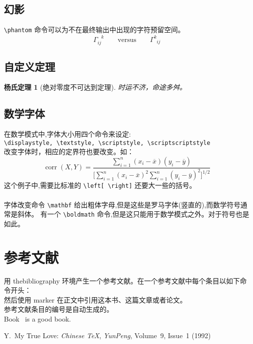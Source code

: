 \documentclass[12pt, a4paper, onecolumn, notitlepage]{article}
\newtheorem{MyTheorem}{杨氏定理}
\begin{document}
\subsection{幻影}
\verb-\phantom- 命令可以为不在最终输出中出现的字符预留空间。
\begin{displaymath}
\Gamma_{ij}^{\phantom{ij}k}
\qquad \textrm{versus} \qquad
\Gamma_{\phantom{k}ij}^{k}
\end{displaymath}
\subsection{自定义定理}
\begin{MyTheorem}[绝对零度不可达到定理]
时运不济，命途多舛。
\end{MyTheorem}
\subsection{数学字体}
在数学模式中,字体大小用四个命令来设定:\\
\verb-\displaystyle, \textstyle, \scriptstyle, \scriptscriptstyle- \\
改变字体时，相应的定界符也要改变。如：
\begin{displaymath}
\mathop{\mathrm{corr}}(X,Y)=
\frac{\displaystyle\sum_{i=1}^n(x_i-\overline x)(y_i-\overline y)}
{\displaystyle\biggl[\sum_{i=1}^n(x_i-\overline x)^2\sum_{i=1}^n(y_i-\overline y)^2\biggr]^{1/2}}
\end{displaymath}
这个例子中,需要比标准的 \verb-\left[ \right]- 还要大一些的括号。\\ \text{} \\

字体改变命令 \verb-\mathbf- 给出粗体字母,但是这些是罗马字体(竖直的),而数学符号通常是斜体。
有一个 \verb-\boldmath- 命令,但是这只能用于数学模式之外。对于符号也是如此。
\section{参考文献}
用 thebibliography 环境产生一个参考文献。在一个参考文献中每个条目以如下命令开头：
{}\\
然后使用 marker 在正文中引用这本书、这篇文章或者论文。
{}\\
参考文献条目的编号是自动生成的。\\
Book~\cite{ReferenceBook} is a good book.
\renewcommand\refname{参考文献}
\begin{thebibliography}{99}%
 Y.~My True Love: \textit{Chinese \TeX}, \textsl{YunPeng}, Volume~9, Issue~1 (1992)
\end{thebibliography}
\end{document}
